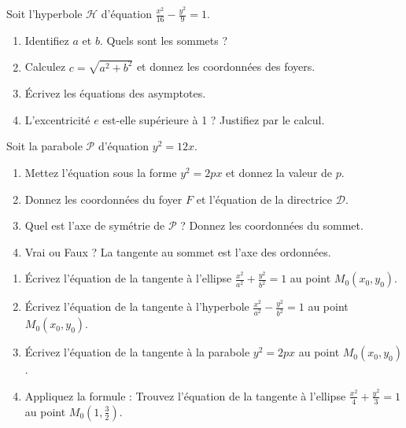 \documentclass[11pt]{article}
\begin{document}
\begin{exercice}
Soit l'hyperbole $\mathcal{H}$ d'équation $\frac{x^2}{16} - \frac{y^2}{9} = 1$.
\begin{enumerate}
    \item Identifiez $a$ et $b$. Quels sont les sommets ?
    \item Calculez $c = \sqrt{a^2 + b^2}$ et donnez les coordonnées des foyers.
    \item Écrivez les équations des asymptotes.
    \item L'excentricité $e$ est-elle supérieure à 1 ? Justifiez par le calcul.
\end{enumerate}
\end{exercice}

\begin{exercice}
Soit la parabole $\mathcal{P}$ d'équation $y^2 = 12x$.
\begin{enumerate}
    \item Mettez l'équation sous la forme $y^2 = 2px$ et donnez la valeur de $p$.
    \item Donnez les coordonnées du foyer $F$ et l'équation de la directrice $\mathcal{D}$.
    \item Quel est l'axe de symétrie de $\mathcal{P}$ ? Donnez les coordonnées du sommet.
    \item Vrai ou Faux ? La tangente au sommet est l'axe des ordonnées.
\end{enumerate}
\end{exercice}

\begin{exercice}
\begin{enumerate}
    \item Écrivez l'équation de la tangente à l'ellipse $\frac{x^2}{a^2} + \frac{y^2}{b^2} = 1$ au point $M_0(x_0, y_0)$.
    \item Écrivez l'équation de la tangente à l'hyperbole $\frac{x^2}{a^2} - \frac{y^2}{b^2} = 1$ au point $M_0(x_0, y_0)$.
    \item Écrivez l'équation de la tangente à la parabole $y^2 = 2px$ au point $M_0(x_0, y_0)$.
    \item Appliquez la formule : Trouvez l'équation de la tangente à l'ellipse $\frac{x^2}{4} + \frac{y^2}{3} = 1$ au point $M_0(1, \frac{3}{2})$.
\end{enumerate}
\end{exercice}
\end{document}
